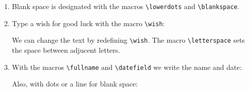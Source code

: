 \documentclass[12pt,a4page]{article}
\def\cellwidth{0.4\textwidth}
\newcommand{\miniexample}[3][t]{%
  \parbox[#1][#3][t]{\cellwidth}{#2}
}
\newcommand{\codeexample}[3][c]{%
  \colorbox[HTML]{b0c4be}{\miniexample[#1]{}{#3}}
}
\newcommand{\textexample}[3][c]{%
  {\footnotesize
    \colorbox[gray]{0.9}{\miniexample[#1]{}{#3}}%
  }
}
\newcommand{\examplerow}[3][10pt]{%
  \par\noindent\strut\hfill\codeexample{#2}{#3}\hspace{#1}\textexample{#2}{#3}\hfill\strut
}
\newlength{\exheight}
\begin{document}
\begin{enumerate}
\item Blank space is designated with the macros \verb|\lowerdots| and \verb|\blankspace|.
  \setlength{\exheight}{24pt}
  \examplerow{exampleMacroBlankspace01.tex}{\exheight}
  \setlength{\exheight}{24pt}
  \examplerow{exampleMacroBlankspace02.tex}{\exheight}
  \setlength{\exheight}{36pt}
  \examplerow{exampleMacroBlankspace03.tex}{\exheight}
  \setlength{\exheight}{38pt}
  \examplerow{exampleMacroBlankspace04.tex}{\exheight}
\item Type a wish for good luck with the macro \verb|\wish|:
  \setlength{\exheight}{30pt}
  \examplerow{exampleMacroWish01.tex}{\exheight}

  We can change the text by redefining \verb|\wish|. The macro \verb/\letterspace/ sets the space between adjucent letters.
  \setlength{\exheight}{60pt}
  \examplerow{exampleMacroWish02.tex}{\exheight}
\item With the macros \verb|\fullname| and \verb|\datefield| we write the name and date:
  \setlength{\exheight}{24pt}
  \examplerow{exampleMacroNameDate01.tex}{\exheight}

  Also, with dots or a line for blank space:
  \examplerow{exampleMacroNameDate02.tex}{\exheight}


\end{enumerate}
\end{document}
